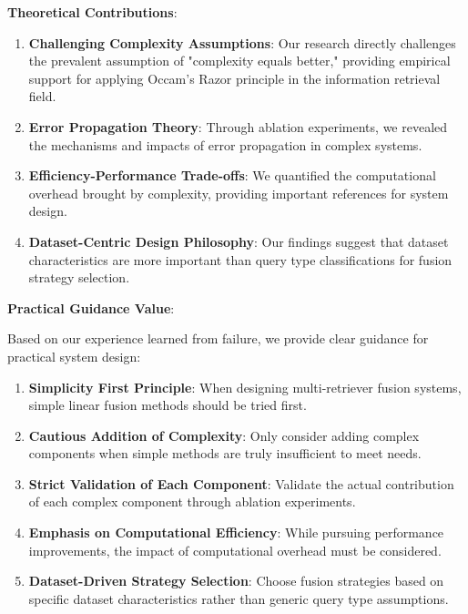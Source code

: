 \documentclass[letterpaper]{article} %
\begin{document}
\textbf{Theoretical Contributions}:
\begin{enumerate}
\item \textbf{Challenging Complexity Assumptions}: Our research directly challenges the prevalent assumption of "complexity equals better," providing empirical support for applying Occam's Razor principle in the information retrieval field.

\item \textbf{Error Propagation Theory}: Through ablation experiments, we revealed the mechanisms and impacts of error propagation in complex systems.

\item \textbf{Efficiency-Performance Trade-offs}: We quantified the computational overhead brought by complexity, providing important references for system design.

\item \textbf{Dataset-Centric Design Philosophy}: Our findings suggest that dataset characteristics are more important than query type classifications for fusion strategy selection.
\end{enumerate}

\textbf{Practical Guidance Value}:

Based on our experience learned from failure, we provide clear guidance for practical system design:
\begin{enumerate}
\item \textbf{Simplicity First Principle}: When designing multi-retriever fusion systems, simple linear fusion methods should be tried first.

\item \textbf{Cautious Addition of Complexity}: Only consider adding complex components when simple methods are truly insufficient to meet needs.

\item \textbf{Strict Validation of Each Component}: Validate the actual contribution of each complex component through ablation experiments.

\item \textbf{Emphasis on Computational Efficiency}: While pursuing performance improvements, the impact of computational overhead must be considered.

\item \textbf{Dataset-Driven Strategy Selection}: Choose fusion strategies based on specific dataset characteristics rather than generic query type assumptions.
\end{enumerate}
\end{document}
